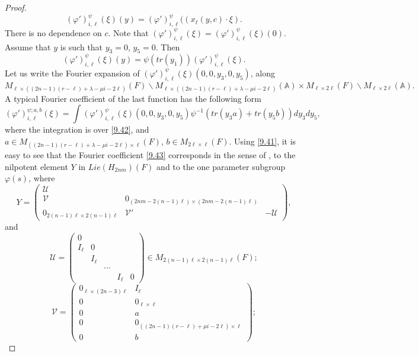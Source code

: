 \documentclass[12pts]{amsart}
\newcommand{\BA}{{\mathbb {A}}}
\newcommand{\I}{{\mathrm{I}}}
\begin{document}
\begin{proof}
 $$
 (\varphi')_{i,\ell}^\psi(\xi)(y)=(\varphi')_{i,\ell}^\psi((x_\ell(y,c)\cdot\xi).
 $$
 There is no dependence on $c$. Note that $(\varphi')_{i,\ell}^\psi(\xi)=(\varphi')_{i,\ell}^\psi(\xi)(0)$. Assume that $y$ is such that $y_3=0$, $y_5=0$. Then
 \begin{equation}\label{9.41}
 (\varphi')_{i,\ell}^\psi(\xi)(y)=\psi(tr(y_1)) (\varphi')_{i,\ell}^\psi(\xi).
 \end{equation}
 Let us write the Fourier expansion of $(\varphi')_{i,\ell}^\psi(\xi)(0,0,y_3,0,y_5)$, along
  \begin{equation}\label{9.42}
 M_{\ell\times ((2n-1)(r-\ell)+\lambda-\mu i-2\ell)}(F)\backslash M_{\ell\times ((2n-1)(r-\ell)+\lambda-\mu i-2\ell)}(\BA)\times M_{\ell\times 2\ell}(F)\backslash M_{\ell\times 2\ell}(\BA).
 \end{equation} 
 A typical Fourier coefficient of the last function has the following form
 \begin{equation}\label{9.43}
 (\varphi')_{i,\ell}^{\psi;a,b}(\xi)=\int (\varphi')_{i,\ell}^\psi(\xi)(0,0,y_3,0,y_5)\psi^{-1}(tr(y_3a)+tr(y_5b))dy_3dy_5,
 \end{equation}
 where the integration is over \eqref{9.42}, and $a\in  M_{((2n-1)(r-\ell)+\lambda-\mu i-2\ell)\times\ell}(F)$, $b\in M_{2\ell\times \ell}(F)$.
 Using \eqref{9.41}, it is easy to see that the Fourier coefficient \eqref{9.43} corresponds 
in the sense of \cite{MW87}, to the nilpotent element $Y$ in $Lie(H_{2nm})(F)$
and to the one parameter subgroup $\varphi(s)$, where
\begin{equation}\label{9.44}
Y=\begin{pmatrix}\mathcal{U}\\
\mathcal{V}&0_{(2nm-2(n-1)\ell)\times (2nm-2(n-1)\ell)}\\0_{2(n-1)\ell\times
	2(n-1)\ell}&\mathcal{V}'&-\mathcal{U}\end{pmatrix},
\end{equation}
and
$$
\mathcal{U}=\begin{pmatrix}0\\I_\ell&0\\&I_\ell\\
&&\cdots\\&&&I_\ell&0\end{pmatrix}\in M_{2(n-1)\ell\times 2(n-1)\ell}(F);
$$
$$
\mathcal{V}=\begin{pmatrix}0_{\ell\times
	(2n-3)\ell}&I_\ell\\0&0_{\ell\times\ell}\\0&a\\0&0_{((2n-1)(r-\ell)+\mu i-2\ell)\times\ell}\\0&b\end{pmatrix};
$$
\end{proof}
\end{document}

